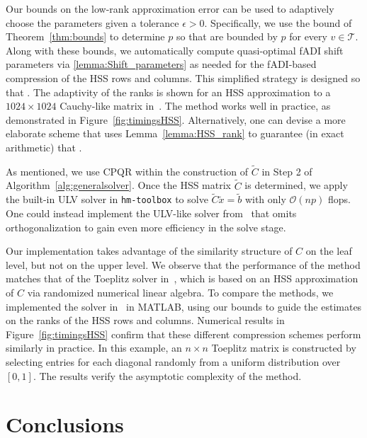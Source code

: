 \documentclass[final,reqno,onefignum,onetabnum]{siamart190516}
\newcommand{\erank}{{\rm rank}_\epsilon}
\begin{document}
Our bounds on the low-rank approximation error can be used to adaptively choose the parameters given a tolerance $\epsilon > 0$.  Specifically, we use the bound of Theorem~\ref{thm:bounds} to determine $p$ so that \smash{$\erank(C_v^{\mathrm{row}})$ and  $\erank(C_v^{\mathrm{col}})$} are bounded by $p$ for every $v \in \mathcal{T}$. Along with these bounds, we automatically compute quasi-optimal fADI shift parameters via \cref{lemma:Shift_parameters} as needed for the fADI-based compression of the HSS rows and columns. This simplified strategy is designed so that . The adaptivity of the ranks is shown for an HSS approximation to a $1024 \times 1024$ Cauchy-like matrix in~. The method works well in practice, as demonstrated in Figure~\ref{fig:timingsHSS}.  Alternatively, one can devise a more elaborate scheme that uses Lemma~\ref{lemma:HSS_rank} to guarantee (in exact arithmetic) that .  

As mentioned, we use CPQR within the construction of $\widetilde{C}$ in Step 2 of Algorithm~\ref{alg:generalsolver}.
Once the HSS matrix $\widetilde{C}$ is determined, we apply the built-in ULV solver in \texttt{hm-toolbox} to solve $\widetilde{C}\widetilde{x} = \widetilde{b}$ with only $\mathcal{O}(n p)$ flops. One could instead implement the ULV-like solver from~\cite{xia2012superfast} that omits orthogonalization to gain even more efficiency in the solve stage.

Our implementation takes  advantage of the similarity structure of $C$ on the leaf level, but not on the upper level.
 We observe that the performance of the method  matches that of the  Toeplitz solver in~\cite{xia2012superfast}, which is based on an HSS approximation of $C$ via randomized numerical linear algebra. To compare the methods, we implemented the solver in~\cite{xia2012superfast} in MATLAB, using our bounds to guide the estimates on the ranks of the HSS rows and columns.  Numerical results in Figure~\ref{fig:timingsHSS} confirm that these different compression schemes perform similarly in practice.  In this example, an $n \times n$ Toeplitz matrix is constructed by selecting entries for each diagonal randomly from a uniform distribution over $[0, 1]$. The results verify the asymptotic complexity of the method.
 
 
 
 \section{Conclusions}
 
\end{document}
